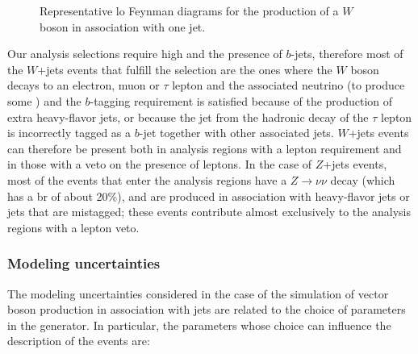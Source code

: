 \begin{figure}[h]
\centering 
{}
\caption{Representative \gls{lo} Feynman diagrams for the production of a $W$ boson in association with one jet.}\label{fig:W_prod}
\end{figure}

Our analysis selections require high \met and the presence of $b$-jets, therefore most of the $W$+jets events that fulfill the selection are the ones where the $W$ boson decays to an electron, muon or $\tau$ lepton 
and the associated neutrino (to produce some \met) and the $b$-tagging requirement is satisfied because of the production of extra heavy-flavor jets, or because the jet from the hadronic decay of the $\tau$
lepton is incorrectly tagged as a $b$-jet together with other associated jets. 
$W$+jets events can therefore be present both in analysis regions with a lepton requirement and in those with a veto on the presence of leptons. 
In the case of $Z$+jets events, most of the events that enter the analysis regions have a $Z \to \nu \nu$ decay (which has a \gls{br} of about 20\%), and are produced in association with 
heavy-flavor jets or jets that are mistagged; these events contribute almost exclusively to the analysis regions with a lepton veto. 

\subsubsection*{Modeling uncertainties}

The modeling uncertainties considered in the case of the simulation of vector boson production in association with jets are related to the choice of parameters in the \Sherpa generator. 
In particular, the parameters whose choice can influence the description of the events are:

